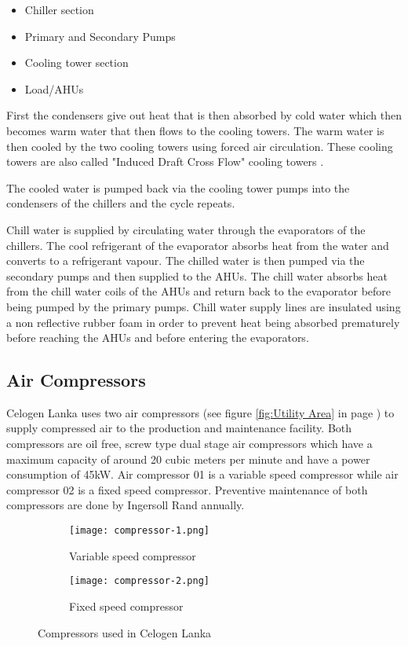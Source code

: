 \documentclass[a4paper,12pt]{article}
\begin{document}
			\begin{itemize}
				\item Chiller section
				\item Primary and Secondary Pumps
				\item Cooling tower section
				\item Load/AHUs			
			\end{itemize}		
			
			First the condensers give out heat that is then absorbed by cold water which then becomes warm water that then flows to the cooling towers. The warm water is then cooled by the two cooling towers using forced air circulation. These cooling towers are also called "Induced Draft Cross Flow" cooling towers \cite{ct-1}\citep{ct-2}.
			
			The cooled water is pumped back via the cooling tower pumps into the condensers of the chillers and the cycle repeats.
			
			Chill water is supplied by circulating water through the evaporators of the chillers. The cool refrigerant of the evaporator absorbs heat from the water and converts to a refrigerant vapour. The chilled water is then pumped via the secondary pumps and then supplied to the AHUs.
			The chill water absorbs heat from the chill water coils of the AHUs and return back to the evaporator before being pumped by the primary pumps.
			Chill water supply lines are insulated using a non reflective rubber foam in order to prevent heat being absorbed prematurely before reaching the AHUs and before entering the evaporators.
			
				  
			\newpage
			\subsection{Air Compressors}
				Celogen Lanka uses two air compressors (see figure \ref{fig:Utility Area} in page \pageref{fig:Utility Area}) to supply compressed air to the production and maintenance facility.
				Both compressors are oil free, screw type dual stage air compressors which have a maximum capacity of around 20 cubic meters per minute and have a power consumption of 45kW. 
				Air compressor 01 is a variable speed compressor while air compressor 02 is a fixed speed compressor.
				Preventive maintenance of both compressors are done by Ingersoll Rand annually.
				\begin{figure}[H]
					\centering
					\begin{subfigure}{0.5\textwidth}						
						\centering						
						\texttt{[image: compressor-1.png]}
				 		\label{subfig:compressor-1}
				 		\caption{Variable speed compressor}
				 	\end{subfigure}
				 	\vfill
				 	\vspace*{1cm}
				 	\begin{subfigure}{0.5\textwidth}
				 		\centering
						\texttt{[image: compressor-2.png]}				 					\label{subfig:compressor-2}
						\caption{Fixed speed compressor}
				 	\end{subfigure}
				 	\label{fig:compressors-at-celogen}
				 	\caption{Compressors used in Celogen Lanka}
				\end{figure}
				
\end{document}

